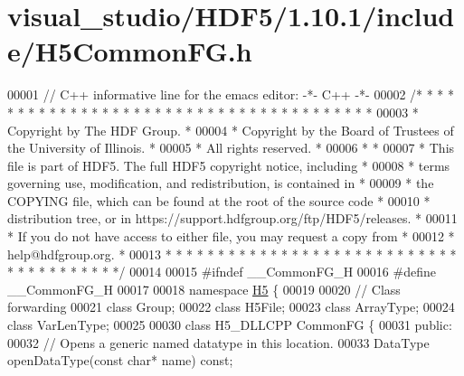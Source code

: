 \hypertarget{visual__studio_2_h_d_f5_21_810_81_2include_2_h5_common_f_g_8h_source}{}\section{visual\+\_\+studio/\+H\+D\+F5/1.10.1/include/\+H5\+Common\+FG.h}
\label{visual__studio_2_h_d_f5_21_810_81_2include_2_h5_common_f_g_8h_source}

\begin{DoxyCode}
00001 \textcolor{comment}{// C++ informative line for the emacs editor: -*- C++ -*-}
00002 \textcolor{comment}{/* * * * * * * * * * * * * * * * * * * * * * * * * * * * * * * * * * * * * * *}
00003 \textcolor{comment}{ * Copyright by The HDF Group.                                               *}
00004 \textcolor{comment}{ * Copyright by the Board of Trustees of the University of Illinois.         *}
00005 \textcolor{comment}{ * All rights reserved.                                                      *}
00006 \textcolor{comment}{ *                                                                           *}
00007 \textcolor{comment}{ * This file is part of HDF5.  The full HDF5 copyright notice, including     *}
00008 \textcolor{comment}{ * terms governing use, modification, and redistribution, is contained in    *}
00009 \textcolor{comment}{ * the COPYING file, which can be found at the root of the source code       *}
00010 \textcolor{comment}{ * distribution tree, or in https://support.hdfgroup.org/ftp/HDF5/releases.  *}
00011 \textcolor{comment}{ * If you do not have access to either file, you may request a copy from     *}
00012 \textcolor{comment}{ * help@hdfgroup.org.                                                        *}
00013 \textcolor{comment}{ * * * * * * * * * * * * * * * * * * * * * * * * * * * * * * * * * * * * * * */}
00014 
00015 \textcolor{preprocessor}{#ifndef \_\_CommonFG\_H}
00016 \textcolor{preprocessor}{#define \_\_CommonFG\_H}
00017 
00018 \textcolor{keyword}{namespace }\hyperlink{namespace_h5}{H5} \{
00019 
00020 \textcolor{comment}{// Class forwarding}
00021 \textcolor{keyword}{class }Group;
00022 \textcolor{keyword}{class }H5File;
00023 \textcolor{keyword}{class }ArrayType;
00024 \textcolor{keyword}{class }VarLenType;
00025 
00030 \textcolor{keyword}{class }H5\_DLLCPP CommonFG \{
00031    \textcolor{keyword}{public}:
00032         \textcolor{comment}{// Opens a generic named datatype in this location.}
00033         DataType openDataType(\textcolor{keyword}{const} \textcolor{keywordtype}{char}* name) \textcolor{keyword}{const};

\end{DoxyCode}
